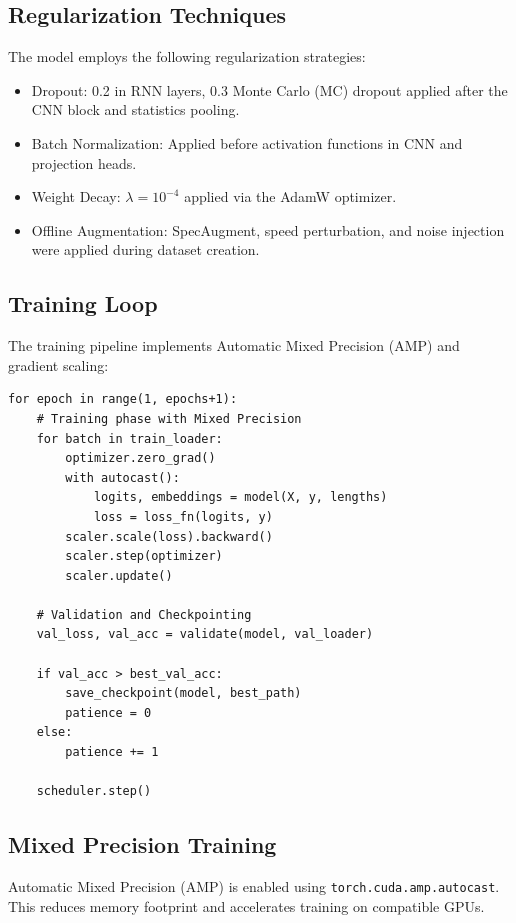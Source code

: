 \documentclass[12pt,a4paper]{article}
\begin{document}
\subsection{Regularization Techniques}

The model employs the following regularization strategies:

\begin{itemize}
    \item Dropout: 0.2 in RNN layers, 0.3 Monte Carlo (MC) dropout applied after the CNN block and statistics pooling.
    \item Batch Normalization: Applied before activation functions in CNN and projection heads.
    \item Weight Decay: $\lambda = 10^{-4}$ applied via the AdamW optimizer.
    \item Offline Augmentation: SpecAugment, speed perturbation, and noise injection were applied during dataset creation.
\end{itemize}

\subsection{Training Loop}

The training pipeline implements Automatic Mixed Precision (AMP) and gradient scaling:

\begin{lstlisting}[caption=Training Loop Structure]
for epoch in range(1, epochs+1):
    # Training phase with Mixed Precision
    for batch in train_loader:
        optimizer.zero_grad()
        with autocast():
            logits, embeddings = model(X, y, lengths)
            loss = loss_fn(logits, y)
        scaler.scale(loss).backward()
        scaler.step(optimizer)
        scaler.update()
    
    # Validation and Checkpointing
    val_loss, val_acc = validate(model, val_loader)
    
    if val_acc > best_val_acc:
        save_checkpoint(model, best_path)
        patience = 0
    else:
        patience += 1
    
    scheduler.step()
\end{lstlisting}

\subsection{Mixed Precision Training}

Automatic Mixed Precision (AMP) is enabled using \texttt{torch.cuda.amp.autocast}. This reduces memory footprint and accelerates training on compatible GPUs.
\end{document}
